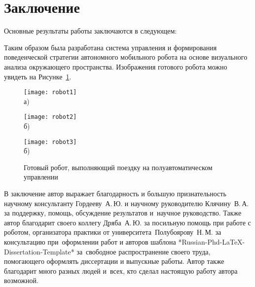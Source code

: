 \chapter*{Заключение}                       %


Основные результаты работы заключаются в следующем:

Таким образом была разработана система управления и формирования поведенческой стратегии автономного мобильного робота на основе визуального анализа окружающего пространства. Изображения готового робота можно увидеть на Рисунке~\cref{fig:done}.

\begin{figure}[ht]
    \begin{minipage}[b][][b]{0.32\linewidth}\centering
        \texttt{[image: robot1]} \\ а)
    \end{minipage}
    \hfill
    \begin{minipage}[b][][b]{0.32\linewidth}\centering
        \texttt{[image: robot2]} \\ б)
    \end{minipage}
    \hfill
    \begin{minipage}[b][][b]{0.32\linewidth}\centering
        \texttt{[image: robot3]} \\ б)
    \end{minipage}
    \caption{Готовый робот, выполняющий поездку на полуавтоматическом управлении}
    \label{fig:done}
\end{figure}

В заключение автор выражает благодарность и большую признательность научному консультанту Гордееву~А.\,Ю. и научному руководителю Клячину~В.\,А. за поддержку, помощь, обсуждение результатов и~научное руководство. Также автор благодарит своего коллегу Дряба~А.\,Ю. за посильную помощь при работе с роботом, организатора практики от университета~Полубоярову~Н.\,М. за консультацию при~оформлении работ и авторов шаблона *Russian-Phd-LaTeX-Dissertation-Template* за~свободное распространение своего труда, помогающего оформлять диссертации и выпускные работы. Автор также благодарит много разных людей и~всех, кто сделал настоящую работу автора возможной.

